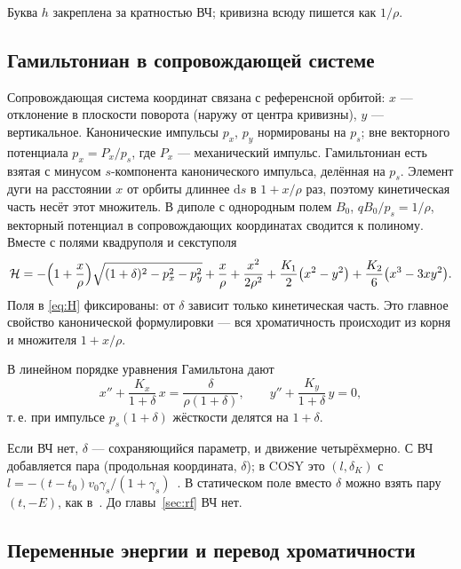 Буква $h$ закреплена за кратностью ВЧ; кривизна всюду пишется как $1/\rho$.

\subsection{Гамильтониан в сопровождающей системе}

Сопровождающая система координат связана с референсной орбитой: $x$ --- отклонение в плоскости поворота (наружу от центра кривизны), $y$ --- вертикальное. Канонические импульсы $p_x$, $p_y$ нормированы на $p_s$; вне векторного потенциала $p_x=P_x/p_s$, где $P_x$ --- механический импульс. Гамильтониан есть взятая с минусом $s$-компонента канонического импульса, делённая на $p_s$. Элемент дуги на расстоянии $x$ от орбиты длиннее $\mathrm{d}s$ в $1+x/\rho$ раз, поэтому кинетическая часть несёт этот множитель. В диполе с однородным полем $B_0$, $qB_0/p_s=1/\rho$, векторный потенциал в сопровождающих координатах сводится к полиному. Вместе с полями квадруполя и секступоля
\begin{equation}
\label{eq:H}
\mathcal{H}
=-\Bigl(1+\frac{x}{\rho}\Bigr)\sqrt{(1+\delta)^2-p_x^2-p_y^2}
+\frac{x}{\rho}+\frac{x^2}{2\rho^2}
+\frac{K_1}{2}\bigl(x^2-y^2\bigr)
+\frac{K_2}{6}\bigl(x^3-3xy^2\bigr).
\end{equation}
Поля в \eqref{eq:H} фиксированы: от $\delta$ зависит только кинетическая часть. Это главное свойство канонической формулировки --- вся хроматичность происходит из корня и множителя $1+x/\rho$.

В линейном порядке уравнения Гамильтона дают
\begin{equation}
\label{eq:hill}
x''+\frac{K_x}{1+\delta}\,x=\frac{\delta}{\rho(1+\delta)},
\qquad
y''+\frac{K_y}{1+\delta}\,y=0,
\end{equation}
т.\,е. при импульсе $p_s(1+\delta)$ жёсткости делятся на $1+\delta$.

Если ВЧ нет, $\delta$ --- сохраняющийся параметр, и движение четырёхмерно. С ВЧ добавляется пара (продольная координата, $\delta$); в COSY это $(l,\delta_K)$ с $l=-(t-t_0)v_0\gamma_s/(1+\gamma_s)$~\cite{ValetovPhD}. В статическом поле вместо $\delta$ можно взять пару $(t,-E)$, как в~\cite{EqNote}. До главы~\ref{sec:rf} ВЧ нет.

\subsection{Переменные энергии и перевод хроматичности}

